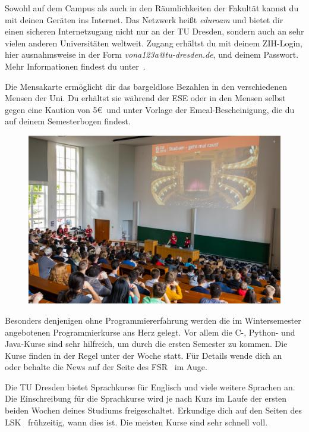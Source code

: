 \begin{itemize}[leftmargin=*]
Sowohl auf dem Campus als auch in den Räumlichkeiten der Fakultät kannst du mit
deinen Geräten ins Internet. Das Netzwerk heißt \textit{eduroam} und bietet dir
einen sicheren Internetzugang nicht nur an der TU Dresden, sondern auch an sehr
vielen anderen Universitäten weltweit. Zugang erhältst du mit deinem ZIH-Login,
hier ausnahmsweise in der Form \textit{vona123a@tu-dresden.de}, und deinem
Passwort. Mehr Informationen findest du unter~.

Die Mensakarte ermöglicht dir das bargeldlose Bezahlen in den verschiedenen
Mensen der Uni. Du erhältst sie während der ESE oder in den Mensen selbst gegen
eine Kaution von 5\euro\ und unter Vorlage der Emeal-Bescheinigung, die du auf
deinem Semesterbogen findest.

\begin{figure}[b!]
\centering
\includegraphics[width=.99\linewidth]{img/ese2018/begruessung.jpg}
\end{figure}

Besonders denjenigen ohne Programmiererfahrung werden die im Wintersemester
angebotenen Programmierkurse ans Herz gelegt. Vor allem die C-, Python- und Java-Kurse
sind sehr hilfreich, um durch die ersten Semester zu kommen. Die Kurse finden in
der Regel unter der Woche statt. Für Details
wende dich an~ oder behalte die News auf der
Seite des FSR~ im Auge.

Die TU Dresden bietet Sprachkurse für Englisch und viele weitere Sprachen an.
Die Einschreibung für die Sprachkurse wird je nach Kurs im Laufe der ersten
beiden Wochen deines Studiums freigeschaltet. Erkundige dich auf den Seiten des
LSK~ frühzeitig, wann dies ist. Die
meisten Kurse sind sehr schnell voll.


\end{itemize}

